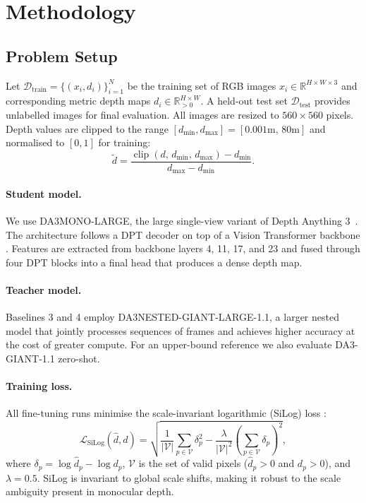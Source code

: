 \documentclass{article}
\begin{document}
\section{Methodology}
\label{sec:method}

\subsection{Problem Setup}

Let $\mathcal{D}_{\text{train}} = \{(x_i, d_i)\}_{i=1}^{N}$ be the training set of RGB images $x_i \in \mathbb{R}^{H \times W \times 3}$ and corresponding metric depth maps $d_i \in \mathbb{R}^{H \times W}_{>0}$.
A held-out test set $\mathcal{D}_{\text{test}}$ provides unlabelled images for final evaluation.
All images are resized to $560 \times 560$ pixels.
Depth values are clipped to the range $[d_{\min}, d_{\max}] = [0.001\text{m},\, 80\text{m}]$ and normalised to $[0, 1]$ for training:
\begin{equation}
    \tilde{d} = \frac{\operatorname{clip}(d,\, d_{\min},\, d_{\max}) - d_{\min}}{d_{\max} - d_{\min}}.
\end{equation}

\paragraph{Student model.}
We use DA3MONO-LARGE, the large single-view variant of Depth Anything 3~\cite{TODO_depthany_v3}.
The architecture follows a DPT decoder \cite{TODO_dpt} on top of a Vision Transformer backbone \cite{TODO_vit}.
Features are extracted from backbone layers 4, 11, 17, and 23 and fused through four DPT blocks into a final head that produces a dense depth map.

\paragraph{Teacher model.}
Baselines 3 and 4 employ DA3NESTED-GIANT-LARGE-1.1, a larger nested model that jointly processes sequences of frames and achieves higher accuracy at the cost of greater compute.
For an upper-bound reference we also evaluate DA3-GIANT-1.1 zero-shot.

\paragraph{Training loss.}
All fine-tuning runs minimise the scale-invariant logarithmic (SiLog) loss \cite{TODO_eigen2014}:
\begin{equation}
    \mathcal{L}_{\text{SiLog}}(\hat{d}, d) = \sqrt{
        \frac{1}{|\mathcal{V}|}\sum_{p \in \mathcal{V}} \delta_p^2
        - \frac{\lambda}{|\mathcal{V}|^2}\!\left(\sum_{p \in \mathcal{V}} \delta_p\right)^{\!2}
    },
    \label{eq:silog}
\end{equation}
where $\delta_p = \log \hat{d}_p - \log d_p$, $\mathcal{V}$ is the set of valid pixels ($\hat{d}_p > 0$ and $d_p > 0$), and $\lambda = 0.5$.
SiLog is invariant to global scale shifts, making it robust to the scale ambiguity present in monocular depth.
\end{document}
